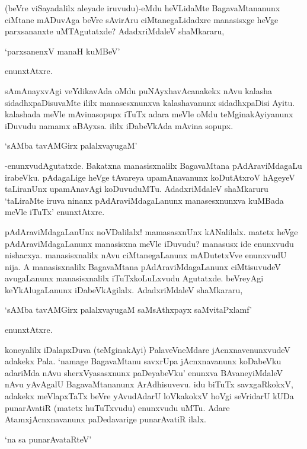 (beVre viSayadalilx aleyade iruvudu)-eMdu heVLidaMte BagavaMtananunx ciMtane mADuvAga beVre sAvirAru ciMtanegaLidadxre manasisxge heVge parxsananxte uMTAgutatxde? AdadxriMdaleV shaMkararu,

\begin{shloka}
`parxsanenxV manaH kuMBeV'
\end{shloka}

enunxtAtxre.

sAmAnayxvAgi veYdikavAda oMdu puNAyxhavAcanakekx nAvu kalasha sidadhxpaDisuvaMte ililx manasesxnunxva kalashavanunx sidadhxpaDisi Ayitu. kalashada meVle mAvinasopupx iTuTx adara meVle oMdu teMginakAyiyanunx iDuvudu namamx aBAyxsa. ililx iDabeVkAda mAvina sopupx.

\begin{shloka}
`sAMba tavAMGirx palalxvayugaM'
\end{shloka}

-enunxvudAgutatxde. Bakatxna manasisxnalilx BagavaMtana pAdAraviMdagaLu irabeVku. pAdagaLige heVge tAvareya upamAnavanunx koDutAtxroV hAgeyeV taLiranUnx upamAnavAgi koDuvuduMTu. AdadxriMdaleV shaMkaruru `taLiraMte iruva ninanx pAdAraviMdagaLanunx manasesxnunxva kuMBada meVle iTuTx' enunxtAtxre.

pAdAraviMdagaLanUnx noVDalilalx! mamasasxnUnx kANalilalx. matetx heVge pAdAraviMdagaLanunx manasisxna meVle iDuvudu? manasusx ide enunxvudu nishacxya. manasisxnalilx nAvu ciMtanegaLanunx mADutetxVve enunxvudU nija. A manasisxnalilx BagavaMtana pAdAraviMdagaLanunx ciMtisuvudeV avugaLanunx manasisxnalilx iTuTxkoLuLxvudu Agutatxde. beVreyAgi keYkAlugaLanunx iDabeVkAgilalx. AdadxriMdaleV shaMkararu,

\begin{shloka}
`sAMba tavAMGirx palalxvayugaM saMsAthxpayx saMvitaPxlamf'
\end{shloka}

enunxtAtxre.

koneyalilx iDalapxDuva (teMginakAyi) PalaveVneMdare jAcnxnavenunxvudeV adakekx Pala. `namage BagavaMtanu savxrUpa jAcnxnavanunx koDabeVku adariMda nAvu sherxVyasasxnunx paDeyabeVku' enunxva BAvaneyiMdaleV nAvu yAvAgalU BagavaMtananunx ArAdhisuvevu. idu biTuTx savxgaRkokxV, adakekx meVlapxTaTx beVre yAvudAdarU loVkakokxV hoVgi seVridarU kUDa punarAvatiR (matetx huTuTxvudu) enunxvudu uMTu. Adare AtamxjAcnxnavanunx paDedavarige punarAvatiR ilalx. 

\begin{shloka}
`na sa punarAvataRteV'
\end{shloka}


